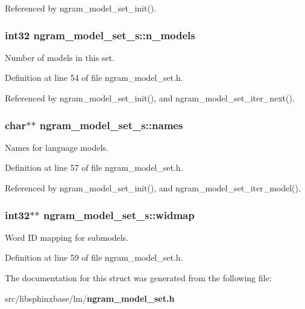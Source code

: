 \-Referenced by ngram\-\_\-model\-\_\-set\-\_\-init().

\subsubsection[{n\-\_\-models}]{\setlength{\rightskip}{0pt plus 5cm}int32 {\bf ngram\-\_\-model\-\_\-set\-\_\-s\-::n\-\_\-models}}\label{structngram__model__set__s_a6c28858d5631a9c9dbc7b2c9583f5c5a}


\-Number of models in this set. 



\-Definition at line 54 of file ngram\-\_\-model\-\_\-set.\-h.



\-Referenced by ngram\-\_\-model\-\_\-set\-\_\-init(), and ngram\-\_\-model\-\_\-set\-\_\-iter\-\_\-next().

\subsubsection[{names}]{\setlength{\rightskip}{0pt plus 5cm}char$\ast$$\ast$ {\bf ngram\-\_\-model\-\_\-set\-\_\-s\-::names}}\label{structngram__model__set__s_aff5e13c45decde4c5bf30d8aa2b1c7d9}


\-Names for language models. 



\-Definition at line 57 of file ngram\-\_\-model\-\_\-set.\-h.



\-Referenced by ngram\-\_\-model\-\_\-set\-\_\-init(), and ngram\-\_\-model\-\_\-set\-\_\-iter\-\_\-model().

\subsubsection[{widmap}]{\setlength{\rightskip}{0pt plus 5cm}int32$\ast$$\ast$ {\bf ngram\-\_\-model\-\_\-set\-\_\-s\-::widmap}}\label{structngram__model__set__s_addebde44e2b7aa22dd82032c316fc962}


\-Word \-I\-D mapping for submodels. 



\-Definition at line 59 of file ngram\-\_\-model\-\_\-set.\-h.



\-The documentation for this struct was generated from the following file\-:\begin{DoxyCompactItemize}
\item 
src/libsphinxbase/lm/{\bf ngram\-\_\-model\-\_\-set.\-h}\end{DoxyCompactItemize}
